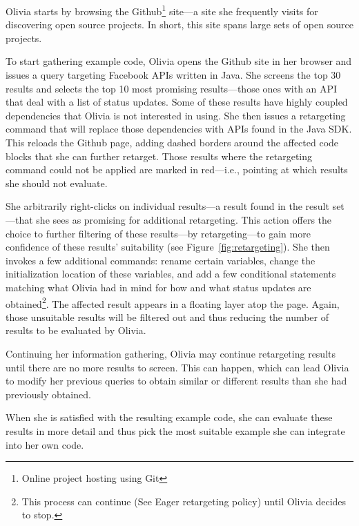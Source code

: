 Olivia starts by browsing the Github\footnote{Online project hosting using Git} site---a site she frequently visits for discovering open source projects. In short, this site spans large sets of open source projects.

To start gathering example code, Olivia opens the Github site in her browser and issues a query targeting Facebook APIs written in Java. She screens the top 30 results and selects the top 10 most promising results---those ones with an API that deal with a list of status updates. Some of these results have highly coupled dependencies that Olivia is not interested in using. She then issues a retargeting command that will replace those dependencies with APIs found in the Java SDK. This reloads the Github page, adding dashed borders around the affected code blocks that she can further retarget. Those results where the retargeting command could not be applied are marked in red---i.e., pointing at which results she should not evaluate.

She arbitrarily right-clicks on individual results---a result found in the result set---that she sees as promising for additional retargeting. This action offers the choice to further filtering of these results---by retargeting---to gain more confidence of these results' suitability (see Figure~\ref{fig:retargeting}). She then invokes a few additional commands: rename certain variables, change the initialization location of these variables, and add a few conditional statements matching what Olivia had in mind for how and what status updates are obtained\footnote{This process can continue (See Eager retargeting policy) until Olivia decides to stop.}. The affected result appears in a floating layer atop the page. Again, those unsuitable results will be filtered out and thus reducing the number of results to be evaluated by Olivia.

Continuing her information gathering, Olivia may continue retargeting results until there are no more results to screen. This can happen, which can lead Olivia to modify her previous queries to obtain similar or different results than she had previously obtained.

When she is satisfied with the resulting example code, she can evaluate these results in more detail and thus pick the most suitable example she can integrate into her own code.

